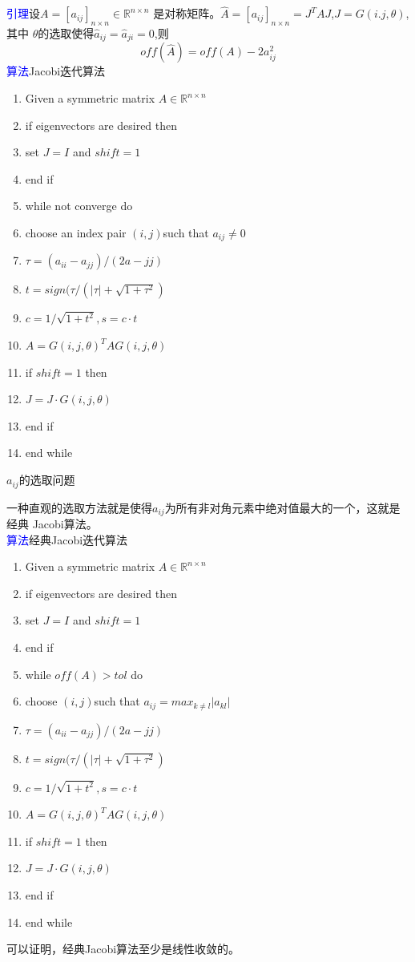 \documentclass[12pt,a4paper]{article}
\begin{document}
\textcolor{blue}{引理}\quad 设$A=[a_{ij}]_{n\times n}\in \mathbb{R}^{n\times n}$
是对称矩阵。$\widehat{A}=[a_{ij}]_{n\times n}=J^TAJ$,$J=G(i.j,\theta)$,其中
$\theta$的选取使得$\widehat a_{ij}=\widehat a_{ji}=0$,则$$off(\widehat
A)=off(A)-2a_{ij}^2$$
\textcolor{blue}{算法}\quad Jacobi迭代算法
\begin{enumerate}[1:]
    \item Given a symmetric matrix $A\in \mathbb R^{n\times n}$
\item if eigenvectors are desired then
\item \quad set $J=I$ and $shift=1$
\item end if
\item while not converge do
\item \quad choose an index pair $(i,j)$such that $a_{ij}\neq 0$
\item \quad $\tau=(a_{ii}-a_{jj})/(2a-{jj})$
\item \quad $t=sign(\tau/(|\tau|+\sqrt{1+\tau ^2})$
\item \quad $c=1/\sqrt{1+t^2},s=c·t$
\item \quad $A=G(i,j,\theta)^TAG(i,j,\theta)$
\item \quad if $shift=1$ then 
\item \qquad $J=J·G(i,j,\theta)$
\item \quad end if
\item end while
\end{enumerate}
$a_{ij}$的选取问题

一种直观的选取方法就是使得$a_{ij}$为所有非对角元素中绝对值最大的一个，这就是经典
Jacobi算法。\\
\textcolor{blue}{算法}\quad 经典Jacobi迭代算法
\begin{enumerate}[1:]
 \item Given a symmetric matrix $A\in \mathbb R^{n\times n}$  
\item if eigenvectors are desired then  
 \item \quad set $J=I$ and $shift=1$  
 \item end if  
 \item while $off(A)>tol $ do
 \item \quad choose $(i,j)$such that $a_{ij}=max_{k\neq l}|a_{kl}|$  
 \item \quad $\tau=(a_{ii}-a_{jj})/(2a-{jj})$  
 \item \quad $t=sign(\tau/(|\tau|+\sqrt{1+\tau ^2})$  
 \item \quad $c=1/\sqrt{1+t^2},s=c·t$  
 \item \quad $A=G(i,j,\theta)^TAG(i,j,\theta)$  
 \item \quad if $shift=1$ then   
 \item \qquad $J=J·G(i,j,\theta)$  
 \item \quad end if  
 \item end while  
 \end{enumerate}  
可以证明，经典Jacobi算法至少是线性收敛的。
\end{document}
